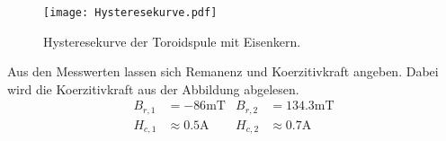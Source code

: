 \begin{figure}
  \centering
  \texttt{[image: Hysteresekurve.pdf]}
  \caption{Hysteresekurve der Toroidspule mit Eisenkern.}
  \label{fig:Hysteresekurve}
\end{figure}

Aus den Messwerten lassen sich Remanenz und Koerzitivkraft angeben.
Dabei wird die Koerzitivkraft aus der Abbildung abgelesen.
\begin{align*}
  B_{r,1} &= -86 \unit{\milli\tesla} &  B_{r,2} &= 134.3 \unit{\milli\tesla} \\
  H_{c,1} &\approx 0.5 \unit{\ampere} & H_{c,2} &\approx 0.7\unit{\ampere}
\end{align*}